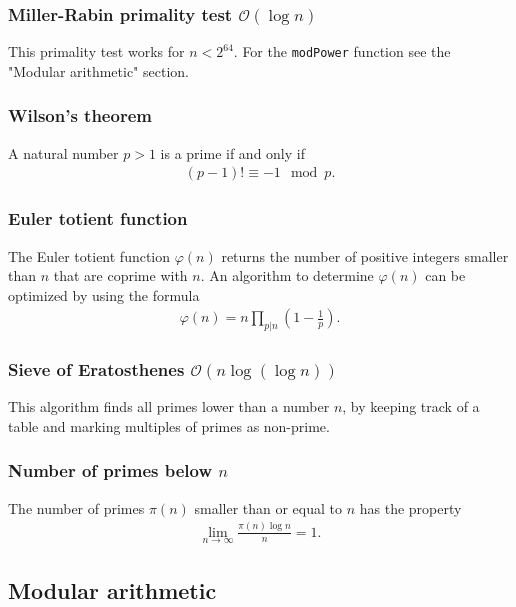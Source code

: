 \subsubsection{Miller-Rabin primality test $\mathcal O(\log n)$}
This primality test works for $n < 2^{64}$. For the \texttt{modPower} function see the "Modular arithmetic" section.

\subsubsection{Wilson's theorem}
A natural number $p > 1$ is a prime if and only if
\begin{align*}
    (p - 1)! \equiv -1 \mod p.
\end{align*}

\subsubsection{Euler totient function}
The Euler totient function $\varphi(n)$ returns the number of positive integers smaller than $n$ that are coprime with $n$. An algorithm to determine $\varphi(n)$ can be optimized by using the formula 
\begin{align*}
    \varphi(n) = n \prod_{p|n} \left(1 - \frac1p\right).
\end{align*}

\subsubsection{Sieve of Eratosthenes $\mathcal O(n\log(\log n))$}
This algorithm finds all primes lower than a number $n$, by keeping track of a table and marking multiples of primes as non-prime.

\subsubsection{Number of primes below $n$}
The number of primes $\pi(n)$ smaller than or equal to $n$ has the property
\begin{align*}
    \lim_{n \to \infty} \frac{\pi(n)\log n }{n} = 1.
\end{align*}



\subsection{Modular arithmetic}

